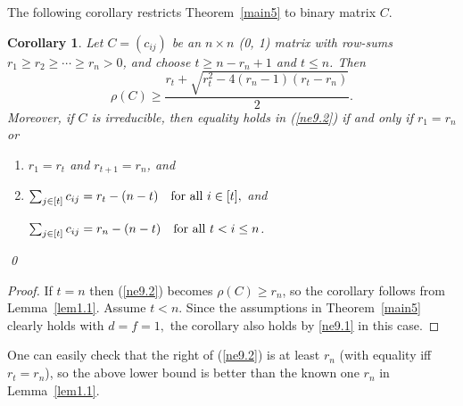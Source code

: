 \documentclass[final,3p, times, 12pt]{elsarticle}
\theoremstyle{plain}
\newtheorem{cor}[thm]{Corollary}
\theoremstyle{definition}
\theoremstyle{remark}
\numberwithin{equation}{section}
\begin{document}
The following corollary restricts Theorem~\ref{main5} to binary matrix $C$.
\begin{cor}\label{cor10.2}
Let
$C=(c_{ij})$ be an $n\times n$ (0, 1) matrix with row-sums $r_1\geq r_2\geq \cdots \geq r_n>0$,
and choose $t\geq n-r_n+1$ and $t\leq n$. Then
\begin{equation}\label{ne9.2}
\rho(C)\geq \frac{r_t+\sqrt{r_t^2-4(r_n-1)(r_t-r_n)}}{2}.\end{equation}
Moreover, if $C$ is irreducible, then equality holds in (\ref{ne9.2}) if and only if $r_1=r_n$ or
\begin{enumerate}
\item[(a)] $r_1=r_t$ and $r_{t+1}=r_n$, and
\item[(b)]
$\sum_{j\in [t]}c_{ij} =r_t-(n-t)\quad \hbox{for all  $i\in [t]$},$ and

$\sum_{j\in [t]}c_{ij} =r_n-(n-t)\quad \hbox{for all  $t<i\leq n$}$.
\end{enumerate}\qed
\end{cor}
\begin{proof}
If $t=n$ then (\ref{ne9.2}) becomes $\rho(C)\geq r_n$, so the corollary follows   from Lemma~\ref{lem1.1}.
Assume $t<n$. Since the assumptions in Theorem~\ref{main5} clearly holds with $d=f=1,$ the corollary also holds by \eqref{ne9.1} in this case.
\end{proof}


One can easily check that the right of (\ref{ne9.2}) is at least $r_n$ (with equality iff $r_t=r_n$), so the above lower bound is better than the known one $r_n$
in Lemma~\ref{lem1.1}.

%
%
%
%
%
\end{document}
